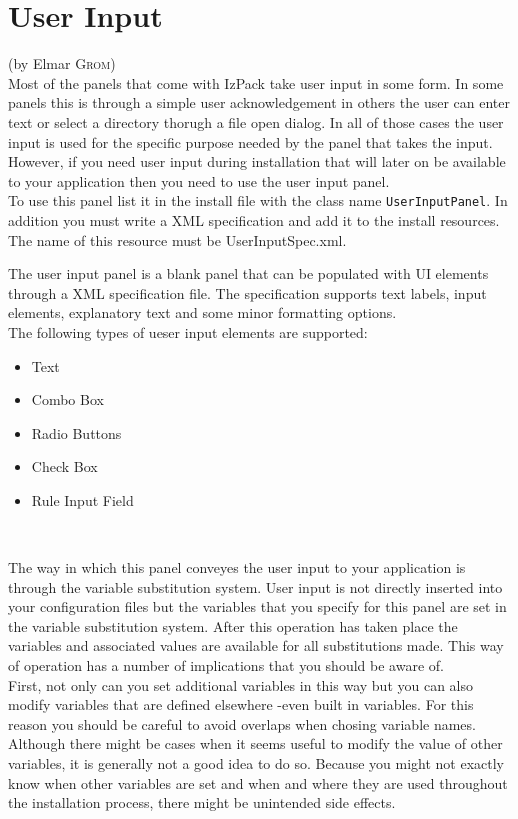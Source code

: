 

\chapter{User Input} (by Elmar \textsc{Grom})\\

Most of the panels that come with IzPack take user input in some form.
In some panels this is through a simple user acknowledgement in others
the user can enter text or select a directory thorugh a file open
dialog. In all of those cases the user input is used for the specific
purpose  needed by the panel that takes the input. However, if you need
user input during installation that will later on be available  to your
application then you need to use the user input panel.\\

To use this panel list it in the install file with the class name
\texttt{UserInputPanel}. In addition you must write a XML specification
and add it to the install resources. The name of this resource must be
UserInputSpec.xml.

The user input panel is a blank panel that can be populated with UI
elements through a XML specification file. The specification supports
text labels, input elements, explanatory text and some minor formatting
options.\\

The following types of ueser input elements are supported:
\begin{itemize}
\item Text
\item Combo Box
\item Radio Buttons
\item Check Box
\item Rule Input Field
\end{itemize}\

The way in which this panel conveyes the user input to your application
is through the variable substitution system. User input is not directly
inserted into your configuration files but the variables that you
specify for this panel are set in the variable substitution system.
After this operation has taken place the variables and associated values
are available for all substitutions made. This way of operation has a
number of implications that you should be aware of.\\

First, not only can you set additional variables in this way but you can
also modify variables that are defined elsewhere -even built in
variables. For this reason you should be careful to avoid overlaps when
chosing variable names. Although there might be cases when it seems
useful to modify the value of other variables, it is generally not a
good idea to do so. Because you might not exactly know when other
variables are set and when and where they are used throughout the
installation process, there might be unintended side effects.\\

